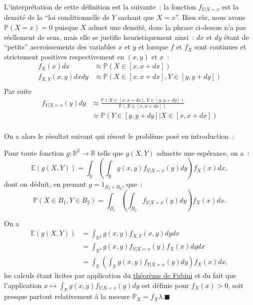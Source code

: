 L'interprétation de cette définition est la suivante~: la fonction
\(f_{Y|X=x}\) est la densité de la ``loi conditionnelle de \(Y\) sachant
que \(X = x\)''. Bien sûr, nous avons \(\mathbb{P}(X = x) = 0\) puisque
\(X\) admet une densité, donc la phrase ci-dessus n'a pas réellement de
sens, mais elle se justifie heuristiquement ainsi~: \(dx\) et \(dy\)
étant de ``petits'' accroissements des variables \(x\) et \(y\) et
lorsque \(f\) et \(f_X\) sont continues et strictement positives
respectivement en \((x,y)\) et \(x\)~: \begin{align*}
f_X(x) dx & \approx \mathbb{P}(X \in [x, x+dx])\\
f_{X,Y}(x,y) dx dy & \approx \mathbb{P}(X \in [x, x+dx], Y \in [y, y+dy])\\
\end{align*} Par suite \begin{align*}
f_{Y|X=x} (y) dy & \approx \frac{\mathbb{P}(X \in [x, x+dx], Y \in [y, y+dy])}{\mathbb{P}(X \in [x, x+dx])}\\
                 & \approx \mathbb{P}(Y \in [y, y+dy]|X \in [x, x+dx])\\
\end{align*}

On a alors le résultat suivant qui résout le problème posé en
introduction~:

\begin{proposition}\label{III-proposition}
Pour toute fonction \(g : \mathbb{R}^2 \to \mathbb{R}\) telle que
\(g(X,Y)\) admette une espérance, on a~:
\[\mathbb{E}(g(X,Y)) = \int_\mathbb{R}\left( \int_\mathbb{R}g(x,y)f_{Y|X=x}(y) dy \right) f_X(x) dx,\]
dont on déduit, en prenant \(g=1_{B_1 \times B_2}\), que~:
\[\mathbb{P}(X\in B_1, Y\in B_2) = \int_{B_1} \left( \int_{B_2}f_{Y|X=x}(y) dy \right) f_X(x) dx.\]
\end{proposition}

\begin{preuve}
On a \begin{align*}
\mathbb{E}(g(X,Y)) &= \int_{\mathbb{R}^2} g(x,y) f_{X,Y}(x,y) dy dx \\
             &= \int_{\mathbb{R}^2} g(x,y) f_{Y|X=x}(y)f_X(x) dy dx \\
             &= \int_\mathbb{R}\left( \int_\mathbb{R}g(x,y)f_{Y|X=x}(y) dy \right) f_X(x)dx,
\end{align*} les calculs étant licites par application du
\href{Probabilité\%20II.pdf\%20\#fubiniproba}{théorème de Fubini} et du
fait que l'application
\(x \mapsto \int_\mathbb{R}g(x,y)f_{Y|X=x}(y) dy\) est définie pour
\(f_X(x) >0\), soit presque partout relativement à la mesure
\(\mathbb{P}_X = f_X \lambda\).\hfill$\blacksquare$
\end{preuve}


